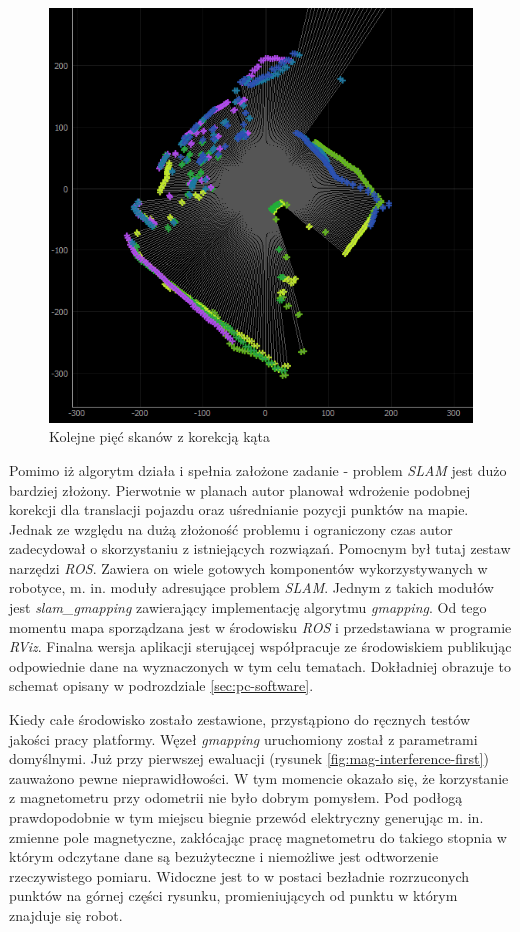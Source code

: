 \begin{figure}[ht]
	\centering
		\includegraphics[width=0.6\linewidth]{rys/ScanBot-15-angular-alignment.PNG}
	\caption{Kolejne pięć skanów z korekcją kąta}
	\label{fig:score-alignment-eval-2}
\end{figure}

Pomimo iż algorytm działa i spełnia założone zadanie - problem \emph{SLAM} jest dużo bardziej złożony. Pierwotnie w planach autor planował wdrożenie podobnej korekcji dla translacji pojazdu oraz uśrednianie pozycji punktów na mapie. Jednak ze względu na dużą złożoność problemu i ograniczony czas autor zadecydował o skorzystaniu z istniejących rozwiązań. Pomocnym był tutaj zestaw narzędzi \emph{ROS}. Zawiera on wiele gotowych komponentów wykorzystywanych w robotyce, m. in. moduły adresujące problem \emph{SLAM}. Jednym z takich modułów jest \emph{slam\_gmapping} zawierający implementację algorytmu \emph{gmapping}\cite{Grisetti2005}\cite{gmapping-website}\cite{gmapping-ros}. Od tego momentu mapa sporządzana jest w środowisku \emph{ROS} i przedstawiana w programie \emph{RViz}. Finalna wersja aplikacji sterującej współpracuje ze środowiskiem publikując odpowiednie dane na wyznaczonych w tym celu tematach. Dokładniej obrazuje to schemat opisany w podrozdziale \ref{sec:pc-software}.

Kiedy całe środowisko zostało zestawione, przystąpiono do ręcznych testów jakości pracy platformy. Węzeł \emph{gmapping} uruchomiony został z parametrami domyślnymi. Już przy pierwszej ewaluacji (rysunek \ref{fig:mag-interference-first}) zauważono pewne nieprawidłowości. W tym momencie okazało się, że korzystanie z magnetometru przy odometrii nie było dobrym pomysłem. Pod podłogą prawdopodobnie w tym miejscu biegnie przewód elektryczny generując m. in. zmienne pole magnetyczne, zakłócając pracę magnetometru do takiego stopnia w którym odczytane dane są bezużyteczne i niemożliwe jest odtworzenie rzeczywistego pomiaru. Widoczne jest to w postaci bezładnie rozrzuconych punktów na górnej części rysunku, promieniujących od punktu w którym znajduje się robot.
\\

